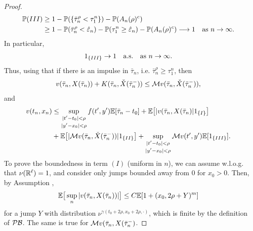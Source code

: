 \begin{proof}
    \begin{align*}
        \mathbb{P}(III) &\geq 1 - \mathbb{P}(\{\bar \tau_n^\rho < \tau_1^n\})  - \mathbb{P}(A_n(\rho)^c)  \\
        & \geq 1 - \mathbb{P}(\bar \tau_n^\rho < \hat \varepsilon_n) - \mathbb{P}(\tau_1^n \geq \hat \varepsilon_n) - \mathbb{P}(A_n(\rho)^c) \longrightarrow 1 \quad \text{as } n \rightarrow \infty.
    \end{align*}
    In particular, 
    \begin{equation*}
        1_{\left\{III\right\}} \rightarrow 1 \quad \text{a.s.} \quad \text{as } n \rightarrow \infty. 
    \end{equation*}
    Thus, using that if there is an impulse in $\bar \tau_n$, i.e. $\bar \tau_n^\rho \geq \tau_1^n$, then
    \begin{equation*}
        v(\bar \tau_n, X(\bar \tau_n)) + K(\bar \tau_n, \check X(\bar \tau_n^-)) \leq \mathcal{M} v(\bar \tau_n, \check{X}(\bar \tau_n^-)),
    \end{equation*}
    and 
    \begin{align*}
        v(t_n,x_n) &\leq \sup_{\substack{|t' - t_0| < \rho \\[2pt] |y' - x_0| < \rho}} f(t', y') \mathbb{E}[\bar \tau_n - t_0] + \mathbb{E} \big[|v(\bar \tau_n, X(\bar \tau_n)| 1_{\left\{I\right\}} \big] \\
        & + \mathbb{E}\big[ |\mathcal{M} v(\bar \tau_n, \check{X}(\bar \tau_n^-))| 1_{\left\{II\right\}} \big] + \sup_{\substack{|t' - t_0| < \rho \\[2pt] |y' - x_0| < \rho}} \mathcal{M} v(t',y') \mathbb{E} [1_{\left\{III\right\}}]. 
        \label{eqn: Theorem 4.8, temporary result 5}
    \end{align*}
    To prove the boundedness in term $(I)$ (uniform in $n$), we can assume w.l.o.g. that $\nu(\mathbb{R}^\ell) = 1$, and consider only jumps bounded away from $0$ for $x_0>0$. Then, by Assumption ,
    \begin{equation*}
        \mathbb{E} \big[ \sup_n |v(\bar \tau_n, X(\bar \tau_n))| \big] \leq C \mathbb{E} [1+(x_0,2 \rho + Y)^m]
    \end{equation*}
    for a jump $Y$ with distribution $\nu^{\gamma(t_0 + 2\rho, x_0+2 \rho, \cdot)}$, which is finite by the definition of $\mathcal{PB}$. The same is true for $\mathcal{M} v(\bar \tau_n,X(\bar \tau_n^-)$. 


\end{proof}

